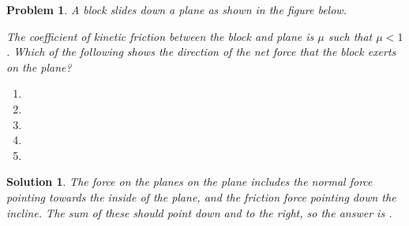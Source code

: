\documentclass[12pt]{article}
\newcommand{\clearpts}{\addtocounter{tpts}{\value{cpts}} \setcounter{cpts}{0}}
\newcommand{\pts}[1]{\clearpts \setcounter{cpts}{#1}}
\newtheorem*{solution}{Solution}
\theoremstyle{mystyle}
\newtheorem{pproblem}{Problem}
\begin{document}
\pts{2}
\begin{pproblem}
    A block slides down a plane as shown in the figure below.

    \begin{figure}[H]
        \centering
    \end{figure}

    The coefficient of kinetic friction between the block and plane is $\mu$ such that $\mu < 1$. Which of the following shows the direction of the net force that
    the block exerts on the \textit{plane}?

    \begin{enumerate}[label=(\Alph*)]
        \item {}
        \item {}
        \item {}
        \item {}
        \item {}
    \end{enumerate}
\end{pproblem}

\begin{solution}
    The force on the planes on the plane includes the normal force pointing towards the inside of the plane, and the friction force pointing down the incline. The sum of these should point down and to the right, so the answer is .
\end{solution}
\end{document}
